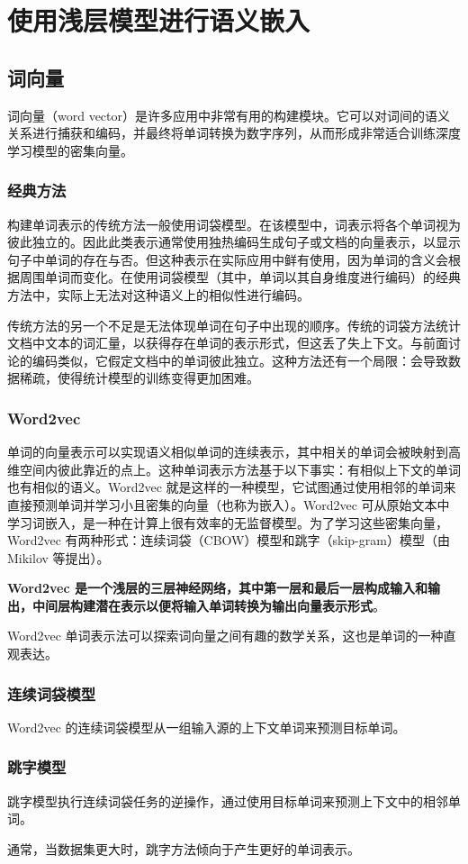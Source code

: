 \chapter{使用浅层模型进行语义嵌入\label{ch04}}
\section{词向量}
词向量（word vector）是许多应用中非常有用的构建模块。它可以对词间的语义关系进行捕获和编码，并最终将单词转换为数字序列，从而形成非常适合训练深度学习模型的密集向量。
\subsection{经典方法}
构建单词表示的传统方法一般使用词袋模型。在该模型中，词表示将各个单词视为彼此独立的。因此此类表示通常使用独热编码生成句子或文档的向量表示，以显示句子中单词的存在与否。但这种表示在实际应用中鲜有使用，因为单词的含义会根据周围单词而变化。在使用词袋模型（其中，单词以其自身维度进行编码）的经典方法中，实际上无法对这种语义上的相似性进行编码。

传统方法的另一个不足是无法体现单词在句子中出现的顺序。传统的词袋方法统计文档中文本的词汇量，以获得存在单词的表示形式，但这丢了失上下文。与前面讨论的编码类似，它假定文档中的单词彼此独立。这种方法还有一个局限：会导致数据稀疏，使得统计模型的训练变得更加困难。
\subsection{Word2vec}
单词的向量表示可以实现语义相似单词的连续表示，其中相关的单词会被映射到高维空间内彼此靠近的点上。这种单词表示方法基于以下事实：有相似上下文的单词也有相似的语义。Word2vec 就是这样的一种模型，它试图通过使用相邻的单词来直接预测单词并学习小且密集的向量（也称为嵌入）。Word2vec 可从原始文本中学习词嵌入，是一种在计算上很有效率的无监督模型。为了学习这些密集向量，Word2vec 有两种形式：连续词袋（CBOW）模型和跳字（skip-gram）模型（由 Mikilov 等提出）。

\textbf{Word2vec 是一个浅层的三层神经网络，其中第一层和最后一层构成输入和输出，中间层构建潜在表示以便将输入单词转换为输出向量表示形式}。

Word2vec 单词表示法可以探索词向量之间有趣的数学关系，这也是单词的一种直观表达。
\subsection{连续词袋模型}
Word2vec 的连续词袋模型从一组输入源的上下文单词来预测目标单词。
\subsection{跳字模型}
跳字模型执行连续词袋任务的逆操作，通过使用目标单词来预测上下文中的相邻单词。

通常，当数据集更大时，跳字方法倾向于产生更好的单词表示。